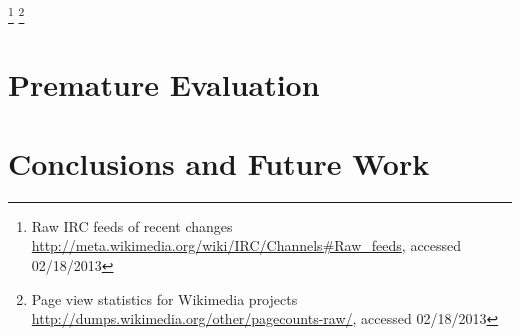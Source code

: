 \documentclass{sig-alternate}
\newcommand{\inlinelistingsize}{\fontsize{8pt}{11pt}}
\let\oldurl\url
\renewcommand{\url}[1]{\inlinelistingsize\oldurl{#1}}
\begin{document}
\footnote{Raw IRC feeds of recent changes \url{http://meta.wikimedia.org/wiki/IRC/Channels\#Raw_feeds}, accessed 02/18/2013}
\footnote{Page view statistics for Wikimedia projects \url{http://dumps.wikimedia.org/other/pagecounts-raw/}, accessed 02/18/2013}

\section{Premature Evaluation}

\section{Conclusions and Future Work}




\balancecolumns
\end{document}
